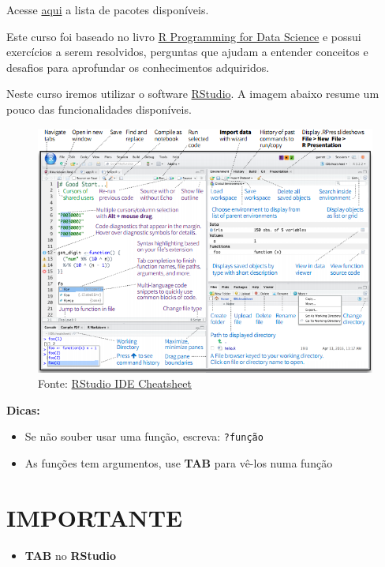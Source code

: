 \documentclass[]{book}
\providecommand{\tightlist}{%
  \setlength{\itemsep}{0pt}\setlength{\parskip}{0pt}}
\theoremstyle{definition}
\theoremstyle{definition}
\theoremstyle{definition}
\theoremstyle{remark}
\begin{document}
Acesse
\href{https://cran.r-project.org/web/packages/available_packages_by_name.html}{aqui}
a lista de pacotes disponíveis.

Este curso foi baseado no livro
\href{https://leanpub.com/rprogramming}{R Programming for Data Science}
e possui {exercícios} a serem resolvidos, {perguntas} que ajudam a
entender conceitos e {desafios} para aprofundar os conhecimentos
adquiridos.

Neste curso iremos utilizar o software
\href{https://www.rstudio.com/}{RStudio}. A imagem abaixo resume um
pouco das funcionalidades disponíveis.

\begin{figure}
\centering
\includegraphics{figuras/rstudio_ide.png}
\caption{Fonte:
\href{https://github.com/rstudio/cheatsheets/raw/master/rstudio-ide.pdf}{RStudio
IDE Cheatsheet}}
\end{figure}

\textbf{Dicas:}

\begin{itemize}
\tightlist
\item
  Se não souber usar uma função, escreva: \texttt{?função}
\item
  As funções tem argumentos, use \textbf{TAB} para vê-los numa função
\end{itemize}

\section{IMPORTANTE}\label{importante}

\begin{itemize}
\tightlist
\item
  \textbf{TAB} no \textbf{RStudio}
\end{itemize}
\end{document}
